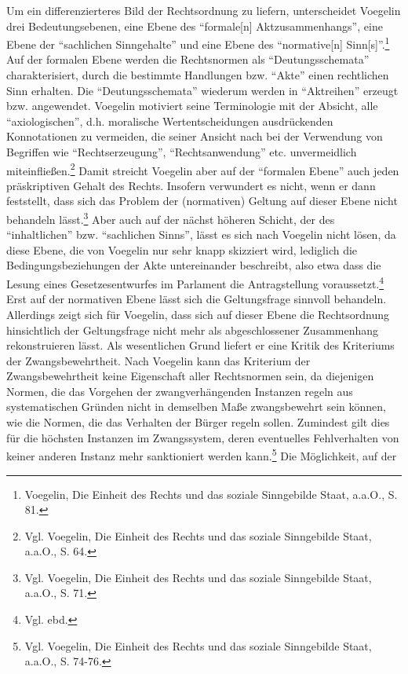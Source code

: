 \documentclass[12pt,a4paper,ngerman]{article}
\begin{document}
Um ein differenzierteres Bild der Rechtsordnung zu liefern, unterscheidet
Voegelin drei Bedeutungsebenen, eine Ebene des "`formale[n]
Aktzusammenhangs"', eine Ebene der "`sachlichen Sinngehalte"' und eine Ebene
des "`normative[n] Sinn[s]"'.\footnote{Voegelin, Die Einheit des Rechts und
  das soziale Sinngebilde Staat, a.a.O., S. 81.} Auf der formalen Ebene werden
die Rechtsnormen als "`Deutungsschemata"' charakterisiert, durch die bestimmte
Handlungen bzw. "`Akte"' einen rechtlichen Sinn erhalten.  Die
"`Deutungsschemata"' wiederum werden in "`Aktreihen"' erzeugt bzw.
angewendet. Voegelin motiviert seine Terminologie mit der Absicht, alle
"`axiologischen"', d.h. moralische Wertentscheidungen ausdrückenden
Konnotationen zu vermeiden, die seiner Ansicht nach bei der Verwendung von
Begriffen wie "`Rechtserzeugung"', "`Rechtsanwendung"' etc. unvermeidlich
miteinfließen.\footnote{Vgl. Voegelin, Die Einheit des Rechts und das soziale
  Sinngebilde Staat, a.a.O., S. 64.} Damit streicht Voegelin aber auf der
"`formalen Ebene"' auch jeden präskriptiven Gehalt des Rechts. Insofern
verwundert es nicht, wenn er dann feststellt, dass sich das Problem der
(normativen) Geltung auf dieser Ebene nicht behandeln lässt.\footnote{Vgl.
  Voegelin, Die Einheit des Rechts und das soziale Sinngebilde Staat, a.a.O.,
  S. 71.} Aber auch auf der nächst höheren Schicht, der des "`inhaltlichen"'
bzw.  "`sachlichen Sinns"', lässt es sich nach Voegelin nicht lösen, da diese
Ebene, die von Voegelin nur sehr knapp skizziert wird, lediglich die
Bedingungsbeziehungen der Akte untereinander beschreibt, also etwa dass die
Lesung eines Gesetzesentwurfes im Parlament die Antragstellung
voraussetzt.\footnote{Vgl. ebd.} Erst auf der normativen Ebene lässt sich die
Geltungsfrage sinnvoll behandeln. Allerdings zeigt sich für Voegelin, dass
sich auf dieser Ebene die Rechtsordnung hinsichtlich der Geltungsfrage nicht
mehr als abgeschlossener Zusammenhang rekonstruieren lässt. Als wesentlichen
Grund liefert er eine Kritik des Kriteriums der Zwangsbewehrtheit. Nach
Voegelin kann das Kriterium der Zwangsbewehrtheit keine Eigenschaft aller
Rechtsnormen sein, da diejenigen Normen, die das Vorgehen der
zwangverhängenden Instanzen regeln aus systematischen Gründen nicht in
demselben Maße zwangsbewehrt sein können, wie die Normen, die das Verhalten
der Bürger regeln sollen. Zumindest gilt dies für die höchsten Instanzen im
Zwangssystem, deren eventuelles Fehlverhalten von keiner anderen Instanz mehr
sanktioniert werden kann.\footnote{Vgl. Voegelin, Die Einheit des Rechts und
  das soziale Sinngebilde Staat, a.a.O., S. 74-76.} Die Möglichkeit, auf der
\end{document}
